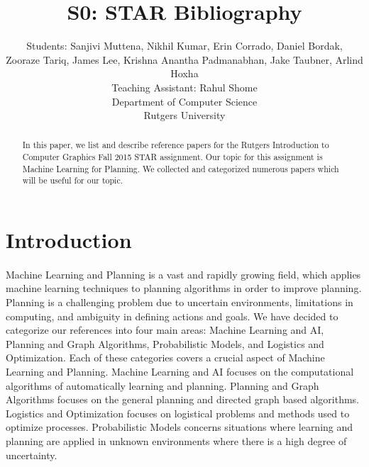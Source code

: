 \documentclass[tog]{acmsiggraph}
\title{S0: STAR Bibliography}
\author{Students: %
 Sanjivi Muttena\emailfoot{sm1727@scarletmail.rutgers.edu}, %
 Nikhil Kumar\emailfoot{nikhilkumar516@gmail.com}, %
 Erin Corrado\emailfoot{e.corrado144@gmail.com}, %
 Daniel Bordak\emailfoot{dbordak@fastmail.fm},%
 \\Zooraze Tariq\emailfoot{zooraze@gmail.com}, %
 James Lee\emailfoot{yl50@scarletmail.rutgers.edu}, %
 Krishna Anantha Padmanabhan\emailfoot{krishna.ananth@rutgers.edu}, %
 Jake Taubner\emailfoot{jdt97@scarletmail.rutgers.edu}, %
 Arlind Hoxha\emailfoot{ah621@scarletmail.rutgers.edu}%
 \\Teaching Assistant: Rahul Shome\emailfoot{rahulshome.in@gmail.com}%
 \\Department of Computer Science%
 \\Rutgers University}
\begin{document}
\maketitle


\begin{abstract}

\paragraph{}

In this paper, we list and describe reference papers for the  Rutgers Introduction to Computer Graphics Fall 2015 STAR assignment. Our topic for this assignment is Machine Learning for Planning. We collected and categorized numerous papers which will be useful for our topic.

\end{abstract}


\keywordlist


\section{Introduction}

\paragraph{}

Machine Learning and Planning is a vast and rapidly growing field, which applies machine learning techniques to planning algorithms in order to improve planning. Planning is a challenging problem due to uncertain environments, limitations in computing, and ambiguity in defining actions and goals. We have decided to categorize our references into four main areas: Machine Learning and AI, Planning and Graph Algorithms, Probabilistic Models, and Logistics and Optimization. Each of these categories covers a crucial aspect of Machine Learning and Planning. Machine Learning and AI focuses on the computational algorithms of automatically learning and planning. Planning and Graph Algorithms focuses on the general planning and directed graph based algorithms. Logistics and Optimization focuses on logistical problems and methods used to optimize processes. Probabilistic Models concerns situations where learning and planning are applied in unknown environments where there is a high degree of uncertainty.
\end{document}
